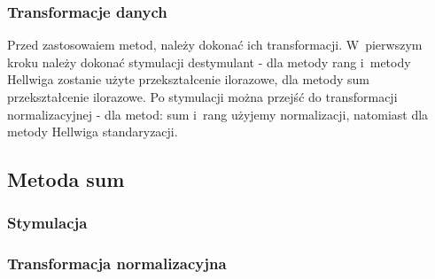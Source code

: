 \documentclass[12pt,a4paper]{report}
\begin{document}
{\begin{Shaded}
\begin{Highlighting}[]
\NormalTok{dane_porzadkowanie<-zbior_danych[}\NormalTok{(}\NormalTok{,}\NormalTok{,}\NormalTok{,}
                                   \NormalTok{,}
                                   \NormalTok{,}\NormalTok{)]}
\end{Highlighting}
\end{Shaded}

\subsubsection{Transformacje danych}\label{transformacje-danych}

Przed zastosowaiem metod, należy dokonać ich transformacji. W~pierwszym
kroku należy dokonać stymulacji destymulant - dla metody rang i~metody
Hellwiga zostanie użyte przekształcenie ilorazowe, dla metody sum
przekształcenie ilorazowe. Po stymulacji można przejść do transformacji
normalizacyjnej - dla metod: sum i~rang użyjemy normalizacji,
natomiast dla metody Hellwiga standaryzacji.


\subsection{Metoda sum}
\subsubsection{Stymulacja} 
\begin{Shaded}
\begin{Highlighting}[]
\NormalTok{)} 
\end{Highlighting}
\end{Shaded}

\subsubsection{Transformacja normalizacyjna}
\begin{Shaded}
\begin{Highlighting}[]
\end{Highlighting}
\end{Shaded}

}
\end{document}
